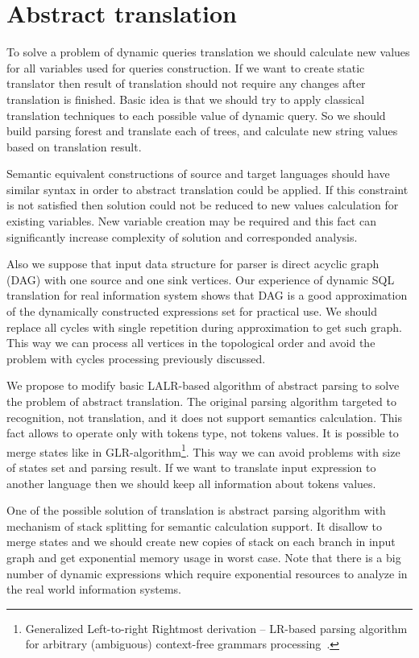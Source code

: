 \section{Abstract translation}
\label{sec:AbstractTranslation}

To solve a problem of dynamic queries translation we should calculate new values for all variables used 
for queries construction. If we want to create static translator then result of translation should not 
require any changes after translation is finished. Basic idea is that we should try to apply classical 
translation techniques to each possible value of dynamic query. So we should build parsing forest and 
translate each of trees, and calculate new string values based on translation result.

Semantic equivalent constructions of source and target languages should have similar syntax in order to 
abstract translation could be applied. If this constraint is not satisfied then solution could not be
 reduced to new values calculation for existing variables. New variable creation may be required and 
this fact can significantly increase complexity of solution and corresponded analysis.

Also we suppose that input data structure for parser is direct acyclic graph (DAG) with one source and 
one sink vertices. Our experience of dynamic SQL translation for real information system shows that DAG 
is a good approximation of the dynamically constructed expressions set for practical use. We should replace 
all cycles with single repetition during approximation to get such graph. This way we can process all vertices 
in the topological order and avoid the problem with cycles processing previously discussed.

We propose to modify basic LALR-based algorithm of abstract parsing to solve the problem of abstract 
translation. The original parsing algorithm targeted to recognition, not translation, and it does not 
support semantics calculation. This fact allows to operate only with tokens type, not tokens values. 
It is possible to merge states like in GLR-algorithm\footnote{Generalized Left-to-right Rightmost 
derivation -- LR-based parsing algorithm for arbitrary (ambiguous) context-free grammars 
processing~\cite{Grune}.}. This way we can avoid problems with size of states set and parsing result.
 If we want to translate input expression to another language then we should keep all information 
about tokens values. 

One of the possible solution of translation is abstract parsing algorithm with mechanism of stack 
splitting for semantic calculation support. It disallow to merge states and we should create new 
copies of stack on each branch in input graph and get exponential memory usage in worst case. 
Note that there is a big number of dynamic expressions which require exponential resources to 
analyze in the real world information systems. 

